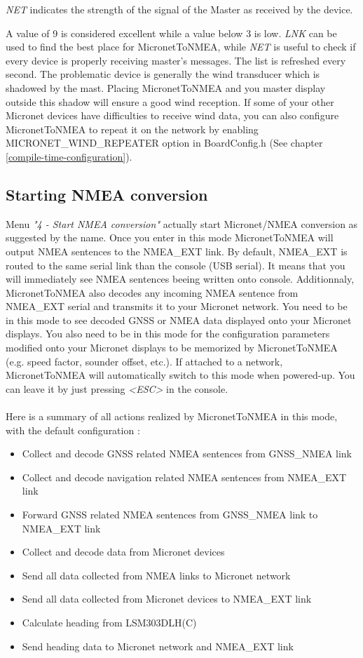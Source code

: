 \documentclass{report}
\begin{document}
\emph{NET} indicates the strength of the signal of the Master as received by the device.

A value of 9 is considered excellent while a value below 3 is low. \emph{LNK} can be used to find the best place for MicronetToNMEA, while \emph{NET} is useful to check if every device is properly receiving master's messages. The list is refreshed every second. The problematic device is generally the wind transducer which is shadowed by the mast. Placing MicronetToNMEA and you master display outside this shadow will ensure a good wind reception. If some of your other Micronet devices have difficulties to receive wind data, you can also configure MicronetToNMEA to repeat it on the network by enabling MICRONET\_WIND\_REPEATER option in BoardConfig.h (See chapter \ref{compile-time-configuration}).

\subsection{Starting NMEA conversion}

Menu \emph{"4 - Start NMEA conversion"} actually start Micronet/NMEA conversion as suggested by the name. Once you enter in this mode MicronetToNMEA will output NMEA sentences to the NMEA\_EXT link. By default, NMEA\_EXT is routed to the same serial link than the console (USB serial). It means that you will immediately see NMEA sentences beeing written onto console. Additionnaly, MicronetToNMEA also decodes any incoming NMEA sentence from NMEA\_EXT serial and transmits it to your Micronet network.
You need to be in this mode to see decoded GNSS or NMEA data displayed onto your Micronet displays. You also need to be in this mode for the configuration parameters modified onto your Micronet displays to be memorized by MicronetToNMEA (e.g. speed factor, sounder offset, etc.).
If attached to a network, MicronetToNMEA will automatically switch to this mode when powered-up. You can leave it by just pressing \emph{<ESC>} in the console.
\\
\\
Here is a summary of all actions realized by MicronetToNMEA in this mode, with the default configuration :
\begin{itemize}
	\item Collect and decode GNSS related NMEA sentences from GNSS\_NMEA link
	\item Collect and decode navigation related NMEA sentences from NMEA\_EXT link
	\item Forward GNSS related NMEA sentences from GNSS\_NMEA link to NMEA\_EXT link
	\item Collect and decode data from Micronet devices
	\item Send all data collected from NMEA links to Micronet network
	\item Send all data collected from Micronet devices to NMEA\_EXT link
	\item Calculate heading from LSM303DLH(C)
	\item Send heading data to Micronet network and NMEA\_EXT link
\end{itemize}
\end{document}
